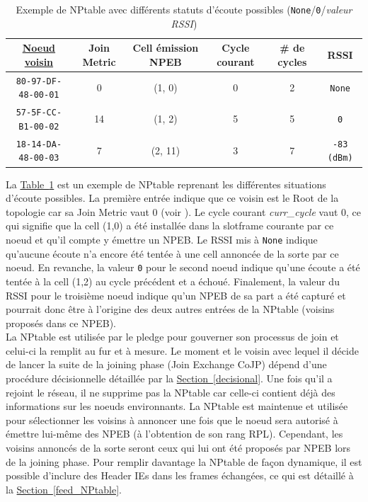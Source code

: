 \documentclass[]{report}
\newcommand{\wordlink}[2]{\hyperref[#2]{#1~\ref{#2}}}
\begin{document}
\begin{table}[h]
\centering
\begin{tabular}{|c|c|c|c|c|c|}
	\hline
    \textbf{\underline{Noeud voisin}} & \textbf{Join Metric} & \textbf{Cell émission NPEB} & \textbf{Cycle courant} & \textbf{\# de cycles} & \textbf{RSSI}\\
    \hline
    \texttt{80-97-DF-48-00-01} & 0 & (1, 0) & 0 & 2 & \texttt{None}\\
    \hline
    \texttt{57-5F-CC-B1-00-02} & 14 & (1, 2) & 5 & 5 & \texttt{0}\\
    \hline
    \texttt{18-14-DA-48-00-03} & 7 & (2, 11) & 3 & 7 & \texttt{-83 (dBm)}\\
    \hline
\end{tabular}
\caption{Exemple de NPtable avec différents statuts d'écoute possibles (\texttt{None}/\texttt{0}/\textit{valeur RSSI})}
\label{NPtable}
\end{table}
\vspace{0.5cm}

La \wordlink{Table}{NPtable} est un exemple de NPtable reprenant les différentes situations d'écoute possibles. La première entrée indique que ce voisin est le Root de la topologie car sa Join Metric vaut 0 (voir \cite{rfc8180}). Le cycle courant \textit{curr\_cycle} vaut 0, ce qui signifie que la cell (1,0) a été installée dans la slotframe courante par ce noeud et qu'il compte y émettre un NPEB. Le RSSI mis à \texttt{None} indique qu'aucune écoute n'a encore été tentée à une cell annoncée de la sorte par ce noeud. En revanche, la valeur \texttt{0} pour le second noeud indique qu'une écoute a été tentée à la cell (1,2) au cycle précédent et a échoué. Finalement, la valeur du RSSI pour le troisième noeud indique qu'un NPEB de sa part a été capturé et pourrait donc être à l'origine des deux autres entrées de la NPtable (voisins proposés dans ce NPEB).\\

La NPtable est utilisée par le pledge pour gouverner son processus de join et celui-ci la remplit au fur et à mesure. Le moment et le voisin avec lequel il décide de lancer la suite de la joining phase (Join Exchange CoJP) dépend d'une procédure décisionnelle détaillée par la \wordlink{Section}{decisional}. Une fois qu'il a rejoint le réseau, il ne supprime pas la NPtable car celle-ci contient déjà des informations sur les noeuds environnants. La NPtable est maintenue et utilisée pour sélectionner les voisins à annoncer une fois que le noeud sera autorisé à émettre lui-même des NPEB (à l'obtention de son rang RPL). Cependant, les voisins annoncés de la sorte seront ceux qui lui ont été proposés par NPEB lors de la joining phase. Pour remplir davantage la NPtable de façon dynamique, il est possible d'inclure des Header IEs dans les frames échangées, ce qui est détaillé à la \wordlink{Section}{feed_NPtable}.
\end{document}
